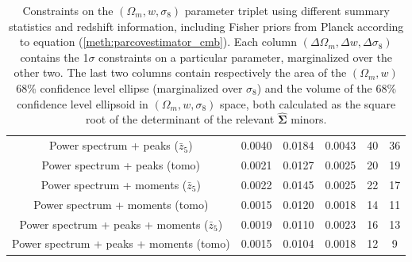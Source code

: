 \documentclass[reprint,aps,prd,superscriptaddress,showkeys,showpacs]{revtex4-1}
\newcommand{\bbh}[1]{\mathbf{\hat{#1}}}
\begin{document}
\begin{table}
\begin{tabular}{c|c|c|c|c|c|}
           Power spectrum + peaks ($\bar{z}_5$) &            0.0040 &     0.0184 &            0.0043 &                            40 &                                         36 \\
                  Power spectrum + peaks (tomo) &            0.0021 &     0.0127 &            0.0025 &                            20 &                                         19 \\
         Power spectrum + moments ($\bar{z}_5$) &            0.0022 &     0.0145 &            0.0025 &                            22 &                                         17 \\
                Power spectrum + moments (tomo) &            0.0015 &     0.0120 &            0.0018 &                            14 &                                         11 \\
 Power spectrum + peaks + moments ($\bar{z}_5$) &            0.0019 &     0.0110 &            0.0023 &                            16 &                                         13 \\
        Power spectrum + peaks + moments (tomo) &            0.0015 &     0.0104 &            0.0018 &                            12 &                                          9 \\ \hline
\bottomrule
\end{tabular}
\caption{Constraints on the $(\Omega_m,w,\sigma_8)$ parameter triplet using different summary statistics and redshift information, including Fisher priors from Planck according to equation (\ref{meth:parcovestimator_cmb}). Each column $(\Delta \Omega_m,\Delta w,\Delta \sigma_8)$ contains the 1$\sigma$ constraints on a particular parameter, marginalized over the other two. The last two columns contain respectively the area of the $(\Omega_m,w)$ 68\% confidence level ellipse (marginalized over $\sigma_8$) and the volume of the 68\% confidence level ellipsoid in $(\Omega_m,w,\sigma_8)$ space, both calculated as the square root of the determinant of the relevant $\bbh{\Sigma}$ minors.}
\label{tbl:constraints-cmb}
\end{table}
\end{document}
